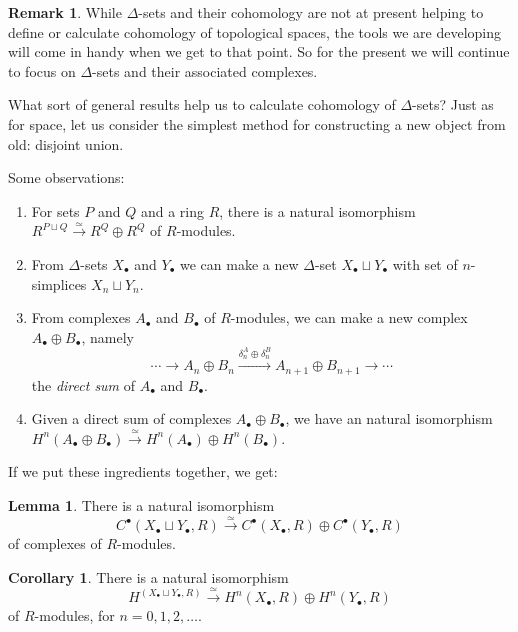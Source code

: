 \documentclass{tufte-handout}
\theoremstyle{definition}
\newtheorem{lemma}{Lemma}
\newtheorem{corollary}{Corollary}
\newtheorem*{rem}{Remark}
\begin{document}
\begin{rem}
While $\Delta$-sets and their cohomology are not at present helping to define or calculate
cohomology of topological spaces, the tools we are developing will come in handy when we get
to that point. So for the present we will continue to focus on $\Delta$-sets and their associated
complexes. 
\end{rem}

What sort of general results help us to calculate cohomology of $\Delta$-sets? Just as for space,
let us consider the simplest method for constructing a new object from old: disjoint union.

Some observations:
\begin{enumerate}
\item For sets $P$ and $Q$ and a ring $R$, there is a natural isomorphism 
$R^{P\sqcup Q} \xrightarrow{\simeq} R^Q \oplus R^Q$ of $R$-modules.

\item From $\Delta$-sets $X_\bullet$ and $Y_\bullet$ we can make a new $\Delta$-set
$X_\bullet\sqcup Y_\bullet$ with set of $n$-simplices $X_n\sqcup Y_n$.

\item From complexes $A_\bullet$ and $B_\bullet$ of $R$-modules, we can make a new complex
$A_\bullet \oplus B_\bullet$, namely
\[
	\cdots \to A_n\oplus B_n \xrightarrow{\delta^A_n\oplus \delta^B_n} A_{n+1}\oplus B_{n+1} \to \cdots
\]
the \emph{direct sum} of $A_\bullet$ and $B_\bullet$.

\item Given a direct sum of complexes $A_\bullet\oplus B_\bullet$, we have an natural isomorphism
$H^n(A_\bullet\oplus B_\bullet) \xrightarrow{\simeq} H^n(A_\bullet)\oplus H^n(B_\bullet)$.
\end{enumerate}

If we put these ingredients together, we get:
\begin{lemma}
There is a natural isomorphism 
\[
	C^\bullet(X_\bullet\sqcup Y_\bullet,R) \xrightarrow{\simeq}
C^\bullet(X_\bullet,R)\oplus C^\bullet(Y_\bullet,R)
\]
of complexes of $R$-modules.
\end{lemma}

\begin{corollary}
There is a natural isomorphism 
\[
H^(X_\bullet\sqcup Y_\bullet,R) \xrightarrow{\simeq} H^n(X_\bullet,R) \oplus H^n(Y_\bullet,R)
\]
of $R$-modules, for $n=0,1,2,\ldots$.
\end{corollary}
\end{document}
